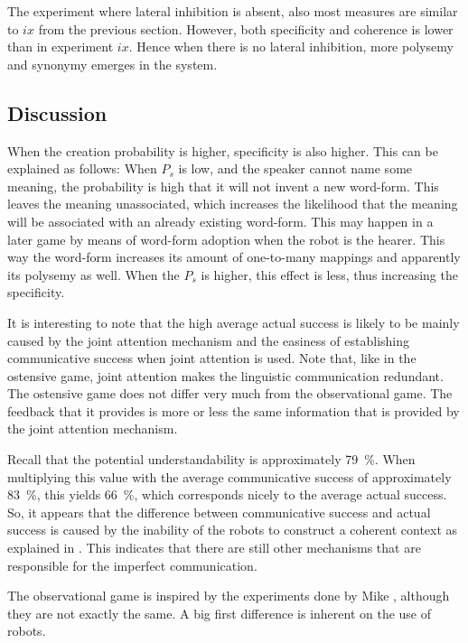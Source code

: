 The experiment where lateral inhibition is absent, also most measures are similar to $ix$ from the previous section. However, both specificity and coherence is lower than in experiment $ix$. Hence when there is no lateral inhibition, more polysemy and synonymy emerges in the system.

\subsection{Discussion}

When the creation probability is higher, specificity is also higher. This can be explained as follows: When $P_s$ is low, and the speaker cannot name some meaning, the probability is high that it will not invent a new word-form. This leaves the meaning unassociated, which increases the likelihood that the meaning will be associated with an already existing word-form. This may happen in a later game by means of word-form adoption when the robot is the hearer. This way the word-form increases its amount of one-to-many mappings and apparently its polysemy as well. When the $P_s$ is higher, this effect is less, thus increasing the specificity.

It is interesting to note that the high average actual success is likely to be mainly caused by the joint attention mechanism and the easiness of establishing communicative success when joint attention is used. Note that, like in the ostensive game, joint attention makes the linguistic communication redundant. The ostensive game does not differ very much from the observational game. The feedback that it provides is more or less the same information that is provided by the joint attention mechanism.

Recall that the potential understandability is approximately 79~\%. When multiplying this value with the average communicative success of approximately 83~\%, this yields 66~\%, which corresponds nicely to the average actual success. So, it appears that the difference between communicative success and actual success is caused by the inability of the robots to construct a coherent context as explained in . This indicates that there are still other mechanisms that are responsible for the imperfect communication.

The observational game is inspired by the experiments done by Mike \citet{oliphant:1997,oliphant:1998,oliphant:2000}, although they are not exactly the same. A big first difference is inherent on the use of robots.

